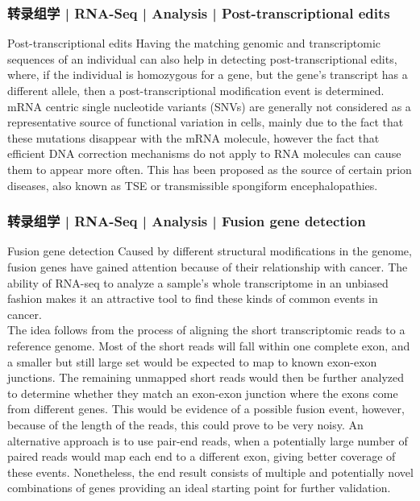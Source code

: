 \begin{frame}
  \frametitle{转录组学 | RNA-Seq | Analysis | Post-transcriptional edits}
  \begin{block}{Post-transcriptional edits}
    Having the matching genomic and transcriptomic sequences of an individual can also help in detecting post-transcriptional edits, where, if the individual is homozygous for a gene, but the gene's transcript has a different allele, then a post-transcriptional modification event is determined.\\
    \vspace{1em}
    mRNA centric single nucleotide variants (SNVs) are generally not considered as a representative source of functional variation in cells, mainly due to the fact that these mutations disappear with the mRNA molecule, however the fact that efficient DNA correction mechanisms do not apply to RNA molecules can cause them to appear more often. This has been proposed as the source of certain prion diseases, also known as TSE or transmissible spongiform encephalopathies.
  \end{block}
\end{frame}

\begin{frame}
  \frametitle{转录组学 | RNA-Seq | Analysis | Fusion gene detection}
  {\footnotesize
  \begin{block}{Fusion gene detection}
  Caused by different structural modifications in the genome, fusion genes have gained attention because of their relationship with cancer. The ability of RNA-seq to analyze a sample's whole transcriptome in an unbiased fashion makes it an attractive tool to find these kinds of common events in cancer.\\
  \vspace{0.5em}
  The idea follows from the process of aligning the short transcriptomic reads to a reference genome. Most of the short reads will fall within one complete exon, and a smaller but still large set would be expected to map to known exon-exon junctions. The remaining unmapped short reads would then be further analyzed to determine whether they match an exon-exon junction where the exons come from different genes. This would be evidence of a possible fusion event, however, because of the length of the reads, this could prove to be very noisy. An alternative approach is to use pair-end reads, when a potentially large number of paired reads would map each end to a different exon, giving better coverage of these events. Nonetheless, the end result consists of multiple and potentially novel combinations of genes providing an ideal starting point for further validation.
  \end{block}
  }
\end{frame}

